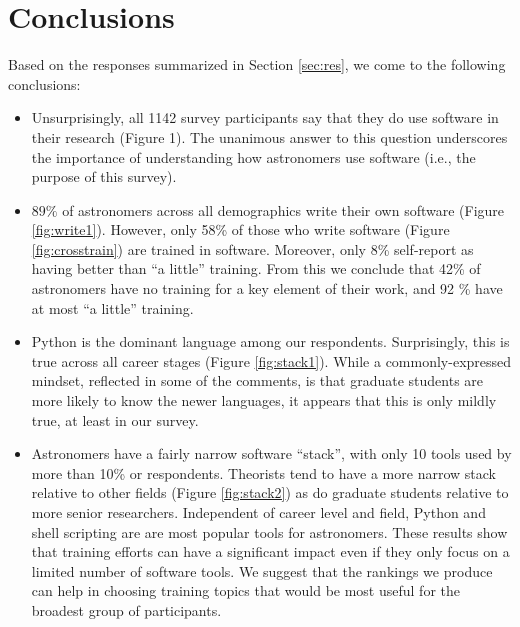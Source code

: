 
\section{Conclusions}
\label{sec:conc}


Based on the responses summarized in Section \ref{sec:res}, we come to the following conclusions:



\begin{itemize}
\item Unsurprisingly, all 1142 survey participants say that they do use software in their research (Figure 1). The unanimous answer to this question underscores the importance of understanding how astronomers use software (i.e., the purpose of this survey).
\item $89\%$ of astronomers across all demographics write their own software (Figure \ref{fig:write1}).  However, only 58\% of those who write software (Figure \ref{fig:crosstrain}) are trained in software.  Moreover, only 8\% self-report as having better than ``a little'' training.  From this we conclude that 42\% of astronomers have no training for a key element of their work, and 92 \% have at most ``a little'' training.  
\item Python is the dominant language among our respondents.  Surprisingly, this is true across all career stages (Figure \ref{fig:stack1}).  While a commonly-expressed mindset, reflected in some of the comments, is that graduate students are more likely to know the newer languages, it appears that this is only mildly true, at least in our survey. 
\item Astronomers have a fairly narrow software ``stack'', with only 10 tools used by more than 10\% or respondents. Theorists tend to have a  more narrow stack relative to other fields (Figure \ref{fig:stack2}) as do graduate students relative to more senior researchers. Independent of career level and field, Python and shell scripting are are most popular tools for astronomers. These results show that training efforts can have a significant impact even if they only focus on a limited number of software tools. We suggest that the rankings we produce can help in choosing training topics that would be most useful for the broadest group of participants. 
\end{itemize}

